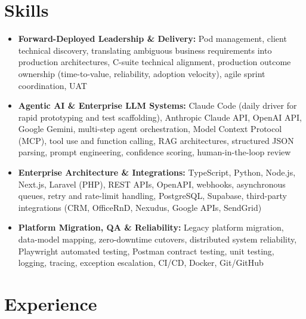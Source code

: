 \documentclass[a4paper,10pt]{article}
\begin{document}
\section{Skills}
\begin{itemize}
  \item \textbf{Forward-Deployed Leadership \& Delivery:} Pod management, client technical discovery, translating ambiguous business requirements into production architectures, C-suite technical alignment, production outcome ownership (time-to-value, reliability, adoption velocity), agile sprint coordination, UAT
  \item \textbf{Agentic AI \& Enterprise LLM Systems:} Claude Code (daily driver for rapid prototyping and test scaffolding), Anthropic Claude API, OpenAI API, Google Gemini, multi-step agent orchestration, Model Context Protocol (MCP), tool use and function calling, RAG architectures, structured JSON parsing, prompt engineering, confidence scoring, human-in-the-loop review
  \item \textbf{Enterprise Architecture \& Integrations:} TypeScript, Python, Node.js, Next.js, Laravel (PHP), REST APIs, OpenAPI, webhooks, asynchronous queues, retry and rate-limit handling, PostgreSQL, Supabase, third-party integrations (CRM, OfficeRnD, Nexudus, Google APIs, SendGrid)
  \item \textbf{Platform Migration, QA \& Reliability:} Legacy platform migration, data-model mapping, zero-downtime cutovers, distributed system reliability, Playwright automated testing, Postman contract testing, unit testing, logging, tracing, exception escalation, CI/CD, Docker, Git/GitHub
\end{itemize}

\section{Experience}
\end{document}
